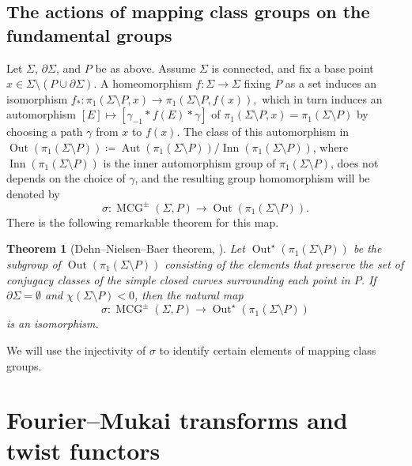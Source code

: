 \documentclass{amsart}
\numberwithin{equation}{section}
\theoremstyle{plain}
\newtheorem{theorem}{Theorem}[section]
\theoremstyle{definition}
\DeclareMathOperator{\MCG}{\mathrm{MCG}}
\DeclareMathOperator{\Aut}{\mathrm{Aut}}
\DeclareMathOperator{\Inn}{\mathrm{Inn}}
\DeclareMathOperator{\Out}{\mathrm{Out}}
\begin{document}
\subsection{The actions of mapping class groups on the fundamental groups}
Let $\Sigma$, $\partial \Sigma$, and $P$ be as above.
Assume $\Sigma$ is connected, and fix a base point $x \in \Sigma \setminus (P \cup \partial \Sigma)$.
A homeomorphism $f \colon \Sigma \to \Sigma$ fixing $P$ as a set induces an isomorphism $f_* \colon \pi_1(\Sigma \setminus P, x) \to \pi_1(\Sigma \setminus P, f(x)), $ which in turn induces an automorphism $[E] \mapsto [\gamma_{-1} * f(E) * \gamma]$ of $\pi_1(\Sigma \setminus P, x) = \pi_1(\Sigma \setminus P)$ by choosing a path $\gamma$ from $x$ to $f(x)$.
The class of this automorphism in $\Out(\pi_1(\Sigma \setminus P)) \coloneqq \Aut(\pi_1(\Sigma \setminus P))/\Inn(\pi_1(\Sigma \setminus P))$, where $\Inn(\pi_1(\Sigma \setminus P))$ is the inner automorphism group of $\pi_1(\Sigma \setminus P)$, does not depends on the choice of $\gamma$, and the resulting group homomorphism will be denoted by
\begin{equation}
    \sigma \colon \MCG^{\pm}(\Sigma, P) \to \Out(\pi_1(\Sigma \setminus P)).
\end{equation}
There is the following remarkable theorem for this map.
\begin{theorem}[Dehn--Nielsen--Baer theorem, {\cite[Theorem 8.8]{MR2850125}}]\label{thm:Dehn--Nielsen--Baer}
    Let $\Out^\star(\pi_1(\Sigma \setminus P))$ be the subgroup of $\Out(\pi_1(\Sigma \setminus P))$
    consisting of the elements that preserve the set of conjugacy classes of the simple closed curves surrounding each point in $P$.
    If $\partial \Sigma = \emptyset$ and $\chi(\Sigma \setminus P)<0$, then the natural map
    \begin{equation}
        \sigma \colon \MCG^{\pm}(\Sigma, P) \to \Out^\star(\pi_1(\Sigma \setminus P))
    \end{equation}
    is an isomorphism.
\end{theorem}
We will use the injectivity of $\sigma$ to identify certain elements of mapping class groups.








\section{Fourier--Mukai transforms and twist functors}\label{section:fourier-mukai-transforms-and-twist-functors}
\end{document}
